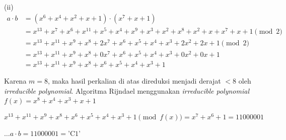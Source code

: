 \documentclass{article}
\begin{document}

(ii) \begin{align*}
a \cdot b &= (x^6 + x^4 + x^2 + x + 1) \cdot (x^7 + x + 1) \\
&= x^{13} + x^7 + x^6 + x^{11} + x^5 + x^4 + x^9 + x^3 + x^2 + x^8 + x^2 + x + x^7 + x + 1 \pmod{2} \\
&= x^{13} + x^{11} + x^9 + x^8 + 2x^7 + x^6 + x^5 + x^4 + x^3 + 2x^2 + 2x + 1 \pmod{2} \\
&= x^{13} + x^{11} + x^9 + x^8 + 0x^7 + x^6 + x^5 + x^4 + x^3 + 0x^2 + 0x + 1 \\
&= x^{13} + x^{11} + x^9 + x^8 + x^6 + x^5 + x^4 + x^3 + 1
\end{align*}

Karena $m = 8$, maka hasil perkalian di atas direduksi menjadi derajat $< 8$ oleh \textit{irreducible polynomial}. Algoritma Rijndael menggunakan \textit{irreducible polynomial} $f(x) = x^8 + x^4 + x^3 + x + 1$

\[ x^{13} + x^{11} + x^9 + x^8 + x^6 + x^5 + x^4 + x^3 + 1 \pmod{f(x)} = x^7 + x^6 + 1 = 11000001 \]

$\dots a \cdot b = 11000001 = \text{'C1'}$
\end{document}
